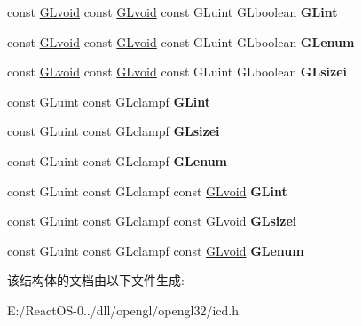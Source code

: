 \begin{DoxyCompactItemize}
\mbox{\label{struct_____g_ldispatch_table_rec_a66cd3474eb70742492bb5fe5ca8967f3}} 
const \hyperlink{interfacevoid}{G\+Lvoid} const \hyperlink{interfacevoid}{G\+Lvoid} const G\+Luint G\+Lboolean {\bfseries G\+Lint}
\item 
\mbox{\label{struct_____g_ldispatch_table_rec_ab49bb7b03b031eef644c55d2dd774a5f}} 
const \hyperlink{interfacevoid}{G\+Lvoid} const \hyperlink{interfacevoid}{G\+Lvoid} const G\+Luint G\+Lboolean {\bfseries G\+Lenum}
\item 
\mbox{\label{struct_____g_ldispatch_table_rec_a3d2bc0eb9539be96b91afbbc339b870f}} 
const \hyperlink{interfacevoid}{G\+Lvoid} const \hyperlink{interfacevoid}{G\+Lvoid} const G\+Luint G\+Lboolean {\bfseries G\+Lsizei}
\item 
\mbox{\label{struct_____g_ldispatch_table_rec_aea1174a493e2ce3d985831b8f96400f1}} 
const G\+Luint const G\+Lclampf {\bfseries G\+Lint}
\item 
\mbox{\label{struct_____g_ldispatch_table_rec_ab3cfb3c3089fe414a822bc9fb9b79b56}} 
const G\+Luint const G\+Lclampf {\bfseries G\+Lsizei}
\item 
\mbox{\label{struct_____g_ldispatch_table_rec_acd216407181122cec01d7adba6119640}} 
const G\+Luint const G\+Lclampf {\bfseries G\+Lenum}
\item 
\mbox{\label{struct_____g_ldispatch_table_rec_a44bafc17e775b98d0af1d1861eb650c1}} 
const G\+Luint const G\+Lclampf const \hyperlink{interfacevoid}{G\+Lvoid} {\bfseries G\+Lint}
\item 
\mbox{\label{struct_____g_ldispatch_table_rec_a1b3398059b71febfd675d1f9ace92cf9}} 
const G\+Luint const G\+Lclampf const \hyperlink{interfacevoid}{G\+Lvoid} {\bfseries G\+Lsizei}
\item 
\mbox{\label{struct_____g_ldispatch_table_rec_a2a2efe95c182189de3fc0dc0e8e61be9}} 
const G\+Luint const G\+Lclampf const \hyperlink{interfacevoid}{G\+Lvoid} {\bfseries G\+Lenum}
\end{DoxyCompactItemize}


该结构体的文档由以下文件生成\+:\begin{DoxyCompactItemize}
\item 
E\+:/\+React\+O\+S-\/0../dll/opengl/opengl32/icd.\+h\end{DoxyCompactItemize}

